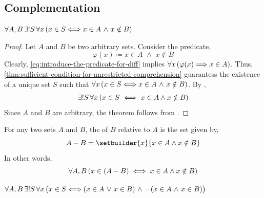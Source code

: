 \subsection{Complementation}
\begin{thm}
    \label{thm:existence-and-uniqueness-of-difference}
    \( \forall A,B \, \exists! S \, \forall x \, \mleft( x \in S {\iff} x \in A \,\,{\land}\,\, x \notin B \mright) \)
\end{thm}

\begin{proof}
    Let \( A \) and \( B \) be two arbitrary sets. Consider the predicate,
    \begin{equation}
        \label{eq:introduce-the-predicate-for-diff}
        \varphi(x) \coloneq x \in A \,\,{\land}\,\, x \notin B
    \end{equation}
    Clearly, \eqref{eq:introduce-the-predicate-for-diff} implies \( \forall x \, \mleft( \varphi(x) {\implies} x \in A \mright) \).
    Thus, \cref{thm:sufficient-condition-for-unrestricted-comprehension} guarantess the existence of a unique set
    \( S \) such that \( \forall x \, \mleft( x \in S {\iff} x \in A \,\,{\land}\,\, x \notin B \mright) \).
    By ,
    \begin{gather*}
        \exists! S \, \forall x \, \mleft( x \in S \iff x \in A \land x \notin B \mright)
    \end{gather*}
    Since \( A \) and \( B \) are arbitrary, the theorem follows from .
\end{proof}

\begin{dfn}
    \label{dfn:difference}
    For any two sets \( A \) and \( B \), the  of \( B \) relative to \( A \) is the set given by,
    \begin{equation*}
        A - B = \setbuilder{x}{x \in A \land x \notin B}
    \end{equation*}
    In other words,
    \begin{equation*}
        \forall A,B \, \mleft( x \in \mleft( A - B \mright) \iff x \in A \land x \notin B \mright)
    \end{equation*}
\end{dfn}

\begin{thm}
    \label{thm:existence-and-uniqueness-of-symmetric-difference}
    \( \forall A,B \, \exists! S \, \forall x \, \big( x \in S {\iff}
        \mleft( x \in A \,\,{\lor}\,\, x \in B \mright) \,\,{\land}\,\,
        \lnot \, \mleft( x \in A \,\,{\land}\,\, x \in B \mright) \big) \)
\end{thm}

